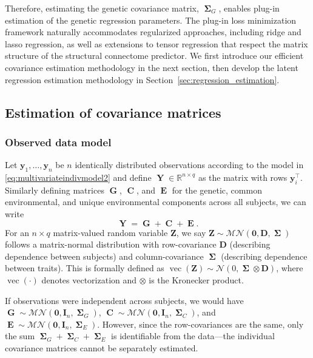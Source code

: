 \documentclass[12pt]{article}
\DeclareMathOperator{\Y}{\mathbf{Y}}
\DeclareMathOperator{\G}{\mathbf{G}}
\DeclareMathOperator{\C}{\mathbf{C}}
\DeclareMathOperator{\E}{\mathbf{E}}
\DeclareMathOperator{\bSigma}{\mathbf{\Sigma}}
\DeclareMathOperator{\vect}{vec}
\begin{document}
Therefore, estimating the genetic covariance matrix, $\bSigma_G$, enables plug-in estimation of the genetic regression parameters. The plug-in loss minimization framework naturally accommodates regularized approaches, including ridge and lasso regression, as well as extensions to tensor regression that respect the matrix structure of the structural connectome predictor. We first introduce our efficient covariance estimation methodology in the next section, then develop the latent regression estimation methodology in Section~\ref{sec:regression_estimation}.

\subsection{Estimation of covariance matrices}
\subsubsection{Observed data model}
Let $\mathbf{y}_1, \dots, \mathbf{y}_n$ be $n$ identically distributed observations according to the model in \eqref{eq:multivariateindivmodel2} and define $\Y \in \mathbb{R}^{n \times q}$ as the matrix with rows $\mathbf{y}_i^\top$. Similarly defining matrices $\G$, $\C$, and $\E$ for the genetic, common environmental, and unique environmental components across all subjects, we can write
\begin{equation} \label{eq:multivariatevariateobservedmodel}
\Y = \G + \C + \E.
\end{equation}
For an $n \times q$ matrix-valued random variable $\mathbf{Z}$, we say $\mathbf{Z} \sim \mathcal{MN}(\mathbf{0}, \mathbf{D}, \bSigma)$ follows a matrix-normal distribution with row-covariance $\mathbf{D}$ (describing dependence between subjects) and column-covariance $\bSigma$ (describing dependence between traits). This is formally defined as $\vect(\mathbf{Z}) \sim \mathcal{N}(0, \bSigma \otimes \mathbf{D})$, where $\vect(\cdot)$ denotes vectorization and $\otimes$ is the Kronecker product.

If observations were independent across subjects, we would have $\G \sim \mathcal{MN}(\mathbf{0}, \mathbf{I}_n, \bSigma_G)$, $\C \sim \mathcal{MN}(\mathbf{0}, \mathbf{I}_n, \bSigma_C)$, and $\E \sim \mathcal{MN}(\mathbf{0}, \mathbf{I}_n, \bSigma_E)$. However, since the row-covariances are the same, only the sum $\bSigma_G + \bSigma_C + \bSigma_E$ is identifiable from the data---the individual covariance matrices cannot be separately estimated.
\end{document}
